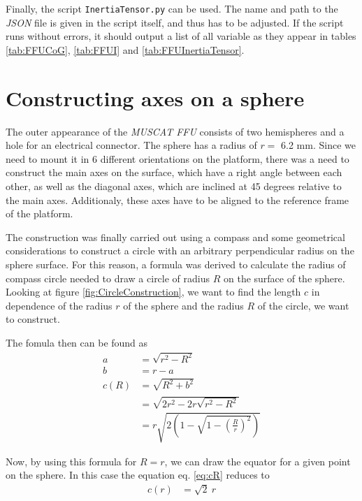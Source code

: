 \documentclass[journal]{IEEEtran}
\begin{document}
Finally, the script \texttt{InertiaTensor.py} can be used. The name and path to the \emph{JSON} file is given in the script itself, and thus has to be adjusted.
If the script runs without errors, it should output a list of all variable as they appear in tables \ref{tab:FFUCoG}, \ref{tab:FFUI} and \ref{tab:FFUInertiaTensor}.


\clearpage
\section{Constructing axes on a sphere}
\label{seq:ConstructAxes}

The outer appearance of the \emph{MUSCAT FFU} consists of two hemispheres and a hole for an electrical connector. The sphere has a radius of $r =$ 6.2 mm.
Since we need to mount it in 6 different orientations on the platform, there was a need to construct the main axes on the surface, which have a right angle between each other, as well as the diagonal axes, which are inclined at 45 degrees relative to the main axes.
Additionaly, these axes have to be aligned to the reference frame of the platform.

The construction was finally carried out using a compass and some geometrical considerations to construct a circle with an arbitrary perpendicular radius on the sphere surface.
For this reason, a formula was derived to calculate the radius of compass circle needed to draw a circle of radius $R$ on the surface of the sphere.
Looking at figure \ref{fig:CircleConstruction}, we want to find the length $c$ in dependence of the radius $r$ of the sphere and the radius $R$ of the circle, we want to construct.

The fomula then can be found as
\begin{align}
	a & = \sqrt{r^2 - R^2} \\
	b & = r - a \\
	c(R) & = \sqrt{R^2 + b^2}\\
	& = \sqrt{2r^2 - 2r \sqrt{r^2 - R^2}} \\
	& = r \sqrt{2 \left(  1 - \sqrt{1 - \left( \frac{R}{r} \right)^2 } \right)}
	\label{eq:cR}
\end{align}

Now, by using this formula for $R = r$, we can draw the equator for a given point on the sphere.
In this case the equation eq. \eqref{eq:cR} reduces to
\begin{align}
	c(r) & = \sqrt{2}~r
\end{align}
\end{document}
